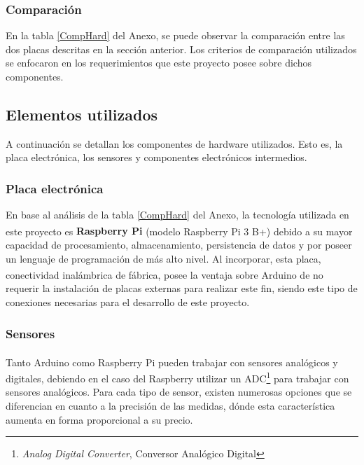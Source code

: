             \subsubsection{Comparación}
                \par En la tabla \ref{CompHard} del Anexo, se puede observar la comparación entre las dos placas descritas en la sección anterior. Los criterios de comparación utilizados se enfocaron en los requerimientos que este proyecto posee sobre dichos componentes.
        
    \subsection{Elementos utilizados}
    \label{subseccionElementosutilizados}
        \par A continuación se detallan los componentes de hardware utilizados. Esto es, la placa electrónica, los sensores y componentes electrónicos intermedios.
        
        \subsubsection{Placa electrónica}
            \par En base al análisis de la tabla \ref{CompHard} del Anexo, la tecnología utilizada en este proyecto es \textbf{Raspberry\textsuperscript{\textregistered} Pi} (modelo Raspberry\textsuperscript{\textregistered} Pi 3 B+) debido a su mayor capacidad de procesamiento, almacenamiento, persistencia de datos y por poseer un lenguaje de programación de más alto nivel. Al incorporar, esta placa, conectividad inalámbrica de fábrica, posee la ventaja sobre Arduino\textsuperscript{\textregistered} de no requerir la instalación de placas externas para realizar este fin, siendo este tipo de conexiones necesarias para el desarrollo de este proyecto. 

        \subsubsection{Sensores}
            \par Tanto Arduino\textsuperscript{\textregistered} como Raspberry\textsuperscript{\textregistered} Pi pueden trabajar con sensores analógicos y digitales, debiendo en el caso del Raspberry\textsuperscript{\textregistered} utilizar un ADC\footnote{\textit{Analog Digital Converter}, Conversor Analógico Digital} para trabajar con sensores analógicos. Para cada tipo de sensor, existen numerosas opciones que se diferencian en cuanto a la precisión de las medidas, dónde esta característica aumenta en forma proporcional a su precio. 
            
